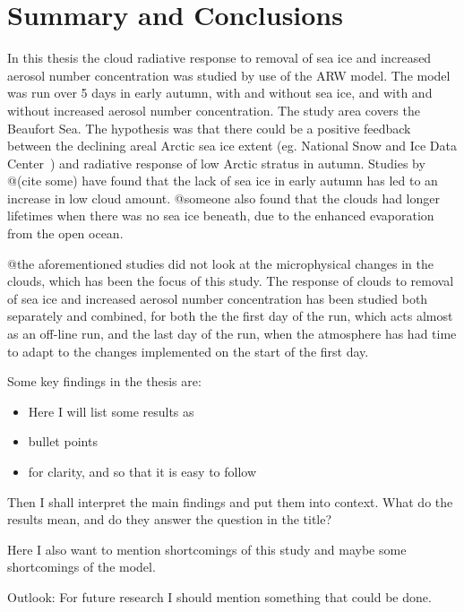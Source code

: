 \chapter{Summary and Conclusions}
\label{chap:summaryconclusions}
In this thesis the cloud radiative response to removal of sea ice and increased aerosol number concentration was studied by use of the ARW model. The model was run over 5 days in early autumn, with and without sea ice, and with and without increased aerosol number concentration. The study area covers the Beaufort Sea. The hypothesis was that there could be a positive feedback between the declining areal Arctic sea ice extent (eg. National Snow and Ice Data Center~\citep{NSIDC}) and radiative response of low Arctic stratus in autumn. Studies by @(cite some) have found that the lack of sea ice in early autumn has led to an increase in low cloud amount. @someone also found that the clouds had longer lifetimes when there was no sea ice beneath, due to the enhanced evaporation from the open ocean. 

@the aforementioned studies did not look at the microphysical changes in the clouds, which has been the focus of this study. The response of clouds to removal of sea ice and increased aerosol number concentration has been studied both separately and combined, for both the the first day of the run, which acts almost as an off-line run, and the last day of the run, when the atmosphere has had time to adapt to the changes implemented on the start of the first day.

Some key findings in the thesis are:
\begin{itemize}
\item Here I will list some results as 
\item bullet points
\item for clarity, and so that it is easy to follow
\end{itemize}

Then I shall interpret the main findings and put them into context. What do the results mean, and do they answer the question in the title? 

Here I also want to mention shortcomings of this study and maybe some shortcomings of the model.

Outlook: For future research I should mention something that could be done.



